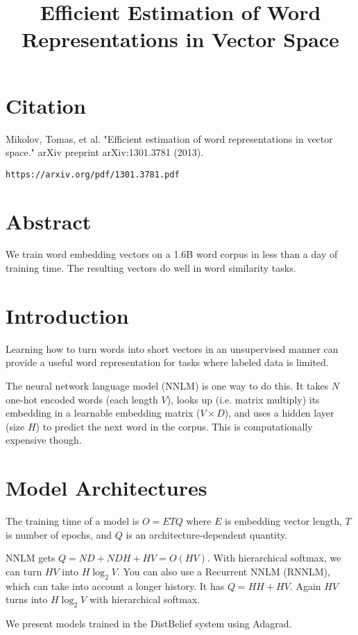 \documentclass[a4paper]{article}
\title{Efficient Estimation of Word Representations in Vector Space}
\date{}
\begin{document}
\maketitle

\section{Citation}
Mikolov, Tomas, et al. "Efficient estimation of word representations in vector space." arXiv preprint arXiv:1301.3781 (2013).

\begin{verbatim}
https://arxiv.org/pdf/1301.3781.pdf
\end{verbatim}

\section{Abstract}
We train word embedding vectors on a 1.6B word corpus in less than a day of
training time. The resulting vectors do well in word similarity tasks.

\section{Introduction}
Learning how to turn words into short vectors in an unsupervised manner can
provide a useful word representation for tasks where labeled data is limited.

The neural network language model (NNLM) is one way to do this. It takes $N$
one-hot encoded words (each length $V$), looks up (i.e. matrix multiply) its
embedding in a learnable embedding matrix ($V \times D$), and uses a hidden layer
(size $H$) to  predict the next word in the corpus. This is computationally
expensive though.

\section{Model Architectures}
The training time of a model is $O = ETQ$ where $E$ is embedding
vector length, $T$ is number of epochs, and $Q$ is an architecture-dependent
quantity.

NNLM gets $Q = ND + NDH + HV = O(HV)$. With hierarchical softmax, we can turn
$HV$ into $H \log_2 V$. You can also use a Recurrent NNLM (RNNLM), which can
take into account a longer history. It has $Q = HH + HV$. Again $HV$ turns
into $H \log_2 V$ with hierarchical softmax.

We present models trained in the DistBelief system using Adagrad.
\end{document}
